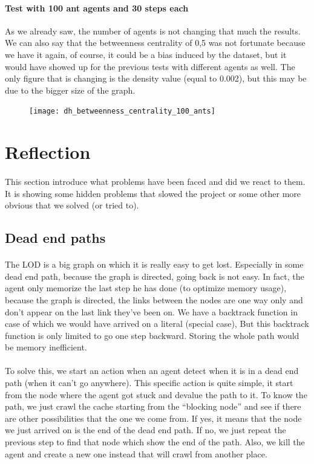 \documentclass{article}
\begin{document}
		\paragraph{Test with 100 ant agents and 30 steps each}
			As we already saw, the number of agents is not changing that much the results.
			We can also say that the betweenness centrality of 0,5 was not fortunate because we have it again,
			of course, it could be a bias induced by the dataset,
			but it would have showed up for the previous tests with different agents as well.
			The only figure that is changing is the density value (equal to 0.002), but this may be due to the bigger size of the graph.
		\begin{figure}[!h]\hspace{2cm}
			\texttt{[image: dh\_betweenness\_centrality\_100\_ants]}
		\end{figure}
		
\section{Reflection}
	\paragraph{}
		This section introduce what problems have been faced and did we react to them.
		It is showing some hidden problems that slowed the project or some other more obvious that we solved (or tried to).
	\subsection{Dead end paths}
		\paragraph{}
			The LOD is a big graph on which it is really easy to get lost.
			Especially in some dead end path, because the graph is directed, going back is not easy.
			In fact, the agent only memorize the last step he has done (to optimize memory usage),
			because the graph is directed, the links between the nodes are one way only and don't appear on the last link they've been on.
			We have a backtrack function in case of which we would have arrived on a literal (special case),
			But this backtrack function is only limited to go one step backward.
			Storing the whole path would be memory inefficient.
		\paragraph{}
			To solve this, we start an action when an agent detect when it is in a dead end path (when it can't go anywhere).
			This specific action is quite simple, it start from the node where the agent got stuck and devalue the path to it.
			To know the path, we just crawl the cache starting from the “blocking node”
			and see if there are other possibilities that the one we come from.
			If yes, it means that the node we just arrived on is the end of the dead end path.
			If no, we just repeat the previous step to find that node which show the end of the path.
			Also, we kill the agent and create a new one instead that will crawl from another place.
\end{document}
